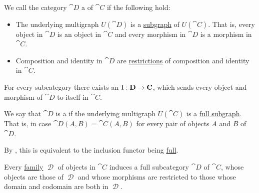 \begin{definition}\label{def:subcategory}
  We call the category \( \cat{D} \) a  of \( \cat{C} \) if the following hold:
  \begin{itemize}
    \item The underlying multigraph \( U(\cat{D}) \) is a \hyperref[def:directed_multigraph/subgraph]{subgraph} of \( U(\cat{C}) \). That is, every object in \( \cat{D} \) is an object in \( \cat{C} \) and every morphism in \( \cat{D} \) is a morphism in \( \cat{C} \).
    \item Composition and identity in \( \cat{D} \) are \hyperref[def:multi_valued_function/restriction]{restrictions} of composition and identity in \( \cat{C} \).
  \end{itemize}

  \begin{thmenum}
     For every subcategory there exists an  \( \operatorname{I}: \operatorname{\mathbf{D}} \to \operatorname{\mathbf{C}} \), which sends every object and morphism of \( \cat{D} \) to itself in \( \cat{C} \).

     We say that \( \cat{D} \) is a  if the underlying multigraph \( U(\cat{C}) \) is a \hyperref[def:directed_multigraph/subgraph]{full subgraph}. That is, in case \( \cat{D}(A, B) = \cat{C}(A, B) \) for every pair of objects \( A \) and \( B \) of \( \cat{D} \).

    By , this is equivalent to the inclusion functor being \hyperref[def:functor_invertibility/full]{full}.

     Every \hyperref[rem:family_of_sets]{family} \( \mscrD \) of objects in \( \cat{C} \) induces a full subcategory \( \cat{D} \) of \( \cat{C} \), whose objects are those of \( \mscrD \) and whose morphisms are restricted to those whose domain and codomain are both in \( \mscrD \).
  \end{thmenum}
\end{definition}

